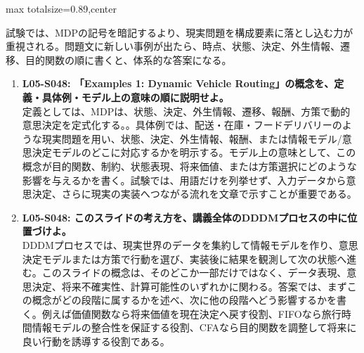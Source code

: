 \begin{minipage}[t]{0.58\textwidth}
\begin{adjustbox}{max totalsize={\textwidth}{0.89\textheight},center}
\begin{minipage}{\textwidth}
試験では、MDPの記号を暗記するより、現実問題を構成要素に落とし込む力が重視される。問題文に新しい事例が出たら、時点、状態、決定、外生情報、遷移、目的関数の順に書くと、体系的な答案になる。\par{}\begin{enumerate}\item \textbf{L05-S048: 「Examples 1: Dynamic Vehicle Routing」の概念を、定義・具体例・モデル上の意味の順に説明せよ。}\\定義としては、MDPは、状態、決定、外生情報、遷移、報酬、方策で動的意思決定を定式化する。。具体例では、配送・在庫・フードデリバリーのような現実問題を用い、状態、決定、外生情報、報酬、または情報モデル/意思決定モデルのどこに対応するかを明示する。モデル上の意味として、この概念が目的関数、制約、状態表現、将来価値、または方策選択にどのような影響を与えるかを書く。試験では、用語だけを列挙せず、入力データから意思決定、さらに現実の実装へつながる流れを文章で示すことが重要である。\item \textbf{L05-S048: このスライドの考え方を、講義全体のDDDMプロセスの中に位置づけよ。}\\DDDMプロセスでは、現実世界のデータを集約して情報モデルを作り、意思決定モデルまたは方策で行動を選び、実装後に結果を観測して次の状態へ進む。このスライドの概念は、そのどこか一部だけではなく、データ表現、意思決定、将来不確実性、計算可能性のいずれかに関わる。答案では、まずこの概念がどの段階に属するかを述べ、次に他の段階へどう影響するかを書く。例えば価値関数なら将来価値を現在決定へ戻す役割、FIFOなら旅行時間情報モデルの整合性を保証する役割、CFAなら目的関数を調整して将来に良い行動を誘導する役割である。\end{enumerate}
\end{minipage}
\end{adjustbox}
\end{minipage}


